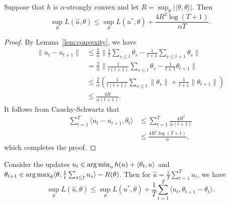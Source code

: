 \documentclass{article}
\begin{document}
\begin{corollary}
Suppose that $h$ is $\alpha$-strongly convex and let $R = \sup_{\theta} |\langle \theta, \theta \rangle|$. Then 
\[ \sup_{\theta} L(\hat{u}, \theta) \leq \sup_{\theta} L(u^*, \theta) + \frac{4R^2\log(T+1)}{\alpha T}. \]
\end{corollary}
\begin{proof}
By Lemma~\ref{lem:convexity}, we have 
\begin{align*}
\|u_t-u_{t+1}\| &\leq \frac{2}{\alpha}\|\frac{1}{t}\sum_{s \leq t}\theta_s - \frac{1}{t+1}\sum_{s \leq t+1}\theta_s\| \\
 &= \frac{2}{\alpha}\|\frac{1}{t(t+1)} \sum_{s \leq t} \theta_s - \frac{1}{t+1} \theta_{t+1}\| \\
 &\leq \frac{2}{\alpha} \left(\frac{1}{t(t+1)} \sum_{s \leq t} \|\theta_s\| + \frac{1}{t+1} \|\theta_{t+1}\|\right) \\
 &\leq \frac{4R}{\alpha (t+1)}.
\end{align*}
It follows from Cauchy-Schwartz that 
\begin{align*}
\sum_{t=1}^T \langle u_t - u_{t+1}, \theta_t \rangle &\leq \sum_{t=1}^T \frac{4R^2}{\alpha (t+1)} \\
 &\leq \frac{4R^2\log(T+1)}{\alpha},
\end{align*}
which completes the proof.
\end{proof}
\begin{proposition}
Consider the updates $u_t \in \argmin_{u} h(u) + \langle \theta_t, u \rangle$ 
and $\theta_{t+1} \in \argmax_{\theta} \langle \theta, \frac{1}{t} \sum_{s \leq t} u_s \rangle - R(\theta)$. 
Then for $\hat{u} = \frac{1}{T} \sum_{t=1}^T u_t$, we have 
\[ \sup_{\theta} L(\hat{u}, \theta) \leq \sup_{\theta} L(u^*, \theta) + \frac{1}{T} \sum_{t=1}^T \langle u_t, \theta_{t+1} - \theta_{t} \rangle. \]
\end{proposition}
\end{document}
